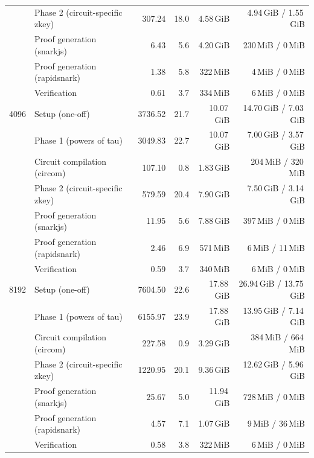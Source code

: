 \begin{table}[t]
{\begin{tabular}{|r|l|r|r|r|r|}
 & \quad Phase 2 (circuit-specific zkey) & 307.24 & 18.0 & 4.58\,GiB & 4.94\,GiB / 1.55\,GiB \\
 & Proof generation (snarkjs) & 6.43 & 5.6 & 4.20\,GiB & 230\,MiB / 0\,MiB \\
 & Proof generation (rapidsnark) & 1.38 & 5.8 & 322\,MiB & 4\,MiB / 0\,MiB \\
 & Verification & 0.61 & 3.7 & 334\,MiB & 6\,MiB / 0\,MiB \\
\hline
4096 & Setup (one-off) & 3736.52 & 21.7 & 10.07\,GiB & 14.70\,GiB / 7.03\,GiB \\
 & \quad Phase 1 (powers of tau) & 3049.83 & 22.7 & 10.07\,GiB & 7.00\,GiB / 3.57\,GiB \\
 & \quad Circuit compilation (circom) & 107.10 & 0.8 & 1.83\,GiB & 204\,MiB / 320\,MiB \\
 & \quad Phase 2 (circuit-specific zkey) & 579.59 & 20.4 & 7.90\,GiB & 7.50\,GiB / 3.14\,GiB \\
 & Proof generation (snarkjs) & 11.95 & 5.6 & 7.88\,GiB & 397\,MiB / 0\,MiB \\
 & Proof generation (rapidsnark) & 2.46 & 6.9 & 571\,MiB & 6\,MiB / 11\,MiB \\
 & Verification & 0.59 & 3.7 & 340\,MiB & 6\,MiB / 0\,MiB \\
\hline
8192 & Setup (one-off) & 7604.50 & 22.6 & 17.88\,GiB & 26.94\,GiB / 13.75\,GiB \\
 & \quad Phase 1 (powers of tau) & 6155.97 & 23.9 & 17.88\,GiB & 13.95\,GiB / 7.14\,GiB \\
 & \quad Circuit compilation (circom) & 227.58 & 0.9 & 3.29\,GiB & 384\,MiB / 664\,MiB \\
 & \quad Phase 2 (circuit-specific zkey) & 1220.95 & 20.1 & 9.36\,GiB & 12.62\,GiB / 5.96\,GiB \\
 & Proof generation (snarkjs) & 25.67 & 5.0 & 11.94\,GiB & 728\,MiB / 0\,MiB \\
 & Proof generation (rapidsnark) & 4.57 & 7.1 & 1.07\,GiB & 9\,MiB / 36\,MiB \\
 & Verification & 0.58 & 3.8 & 322\,MiB & 6\,MiB / 0\,MiB \\
\hline
\end{tabular}}
\end{table}
